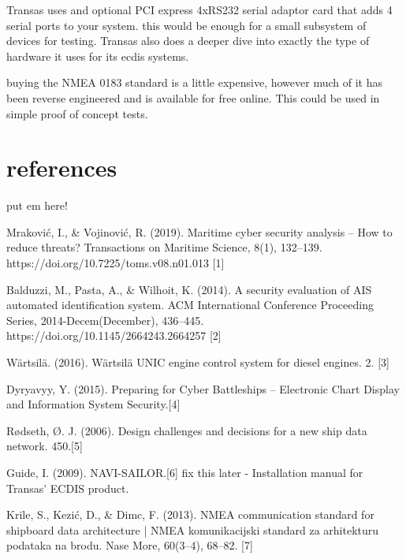 \documentclass{article}
\begin{document}
Transas uses and optional PCI express 4xRS232 serial adaptor card that adds 4 serial ports to your system. this would be enough for a small subsystem of devices for testing. Transas also does a deeper dive into exactly the type of hardware it uses for its ecdis systems.

buying the NMEA 0183 standard is a little expensive, however much of it has been reverse engineered and is available for free online. This could be used in simple proof of concept tests.

\section{references}
put em here!

Mraković, I., \& Vojinović, R. (2019). Maritime cyber security analysis – How to reduce threats? Transactions on Maritime Science, 8(1), 132–139. https://doi.org/10.7225/toms.v08.n01.013 [1]

Balduzzi, M., Pasta, A., \& Wilhoit, K. (2014). A security evaluation of AIS automated identification system. ACM International Conference Proceeding Series, 2014-Decem(December), 436–445. https://doi.org/10.1145/2664243.2664257 [2]

Wärtsilä. (2016). Wärtsilä UNIC engine control system for diesel engines. 2. [3]

Dyryavyy, Y. (2015). Preparing for Cyber Battleships – Electronic Chart Display and Information System Security.[4]

Rødseth, Ø. J. (2006). Design challenges and decisions for a new ship data network. 450.[5]

Guide, I. (2009). NAVI-SAILOR.[6] fix this later - Installation manual for Transas' ECDIS product.

Krile, S., Kezić, D., \& Dimc, F. (2013). NMEA communication standard for shipboard data architecture | NMEA komunikacijski standard za arhitekturu podataka na brodu. Nase More, 60(3–4), 68–82. [7]
\end{document}
